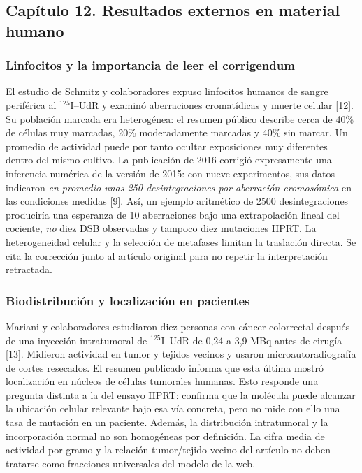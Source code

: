\documentclass[11pt,a4paper,oneside]{article}
\begin{document}
\clearpage
\subsection{Capítulo 12. Resultados externos en material humano}
\label{ampliacion-evidencia}

\subsubsection{Linfocitos y la importancia de leer el corrigendum}
El estudio de Schmitz y colaboradores expuso linfocitos humanos de sangre
periférica al $^{125}$I--UdR y examinó aberraciones cromatídicas y muerte
celular [12]. Su población marcada era heterogénea: el resumen público
describe cerca de 40\% de células muy marcadas, 20\% moderadamente
marcadas y 40\% sin marcar. Un promedio de actividad puede por tanto
ocultar exposiciones muy diferentes dentro del mismo cultivo. La
publicación de 2016 corrigió expresamente una inferencia numérica de la
versión de 2015: con nueve experimentos, sus datos indicaron \emph{en
promedio unas 250 desintegraciones por aberración cromosómica} en las
condiciones medidas [9]. Así, un ejemplo aritmético de 2500
desintegraciones produciría una esperanza de 10 aberraciones bajo una
extrapolación lineal del cociente, \emph{no} diez DSB observadas y tampoco
diez mutaciones HPRT. La heterogeneidad celular y la selección de
metafases limitan la traslación directa. Se cita la corrección junto al
artículo original para no repetir la interpretación retractada.

\subsubsection{Biodistribución y localización en pacientes}
Mariani y colaboradores estudiaron diez personas con cáncer colorrectal
después de una inyección intratumoral de $^{125}$I--UdR de 0,24 a
3,9 MBq antes de cirugía [13]. Midieron actividad en tumor y tejidos
vecinos y usaron microautoradiografía de cortes resecados. El resumen
publicado informa que esta última mostró localización en núcleos de
células tumorales humanas. Esto responde una pregunta distinta a la del
ensayo HPRT: confirma que la molécula puede alcanzar la ubicación
celular relevante bajo esa vía concreta, pero no mide con ello una tasa
de mutación en un paciente. Además, la distribución intratumoral y la
incorporación normal no son homogéneas por definición. La cifra media
de actividad por gramo y la relación tumor/tejido vecino del artículo
no deben tratarse como fracciones universales del modelo de la web.
\end{document}
